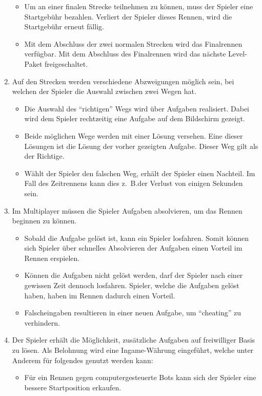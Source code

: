 \begin{enumerate}
\begin{itemize}
			\item{Um an einer finalen Strecke teilnehmen zu können, muss der Spieler eine Startgebühr bezahlen. Verliert der Spieler dieses Rennen, wird die Startgebühr erneut fällig.}
			\item{Mit dem Abschluss der zwei normalen Strecken wird das Finalrennen verfügbar. Mit dem Abschluss des Finalrennen wird das nächste Level-Paket freigeschaltet.}
		\end{itemize}
		\item{Auf den Strecken werden verschiedene Abzweigungen möglich sein, bei welchen der Spieler die Auswahl zwischen zwei Wegen hat.}
		\begin{itemize}
			\item{Die Auswahl des \enquote{richtigen} Wegs wird über Aufgaben realisiert. Dabei wird dem Spieler rechtzeitig eine Aufgabe auf dem Bildschirm gezeigt.}
			\item{Beide möglichen Wege werden mit einer Lösung versehen. Eine dieser Lösungen ist die Lösung der vorher gezeigten Aufgabe. Dieser Weg gilt als der Richtige.}
			\item{Wählt der Spieler den falschen Weg, erhält der Spieler einen Nachteil. Im Fall des Zeitrennens kann dies z.~B.\@ der Verlust von einigen Sekunden sein.}
		\end{itemize}
		\item{Im Multiplayer müssen die Spieler Aufgaben absolvieren, um das Rennen beginnen zu können.}
			\begin{itemize}
				\item{Sobald die Aufgabe gelöst ist, kann ein Spieler losfahren. Somit können sich Spieler über schnelles Absolvieren der Aufgaben einen Vorteil im Rennen erspielen.}
				\item{Können die Aufgaben nicht gelöst werden, darf der Spieler nach einer gewissen Zeit dennoch losfahren. Spieler, welche die Aufgaben gelöst haben, haben im Rennen dadurch einen Vorteil.}
				\item{Falscheingaben resultieren in einer neuen Aufgabe, um \enquote{cheating} zu verhindern.}
			\end{itemize}
		\item{Der Spieler erhält die Möglichkeit, zusätzliche Aufgaben auf freiwilliger Basis zu lösen. Als Belohnung wird eine Ingame-Währung eingeführt, welche unter Anderem für folgendes genutzt werden kann:}
		\begin{itemize}
			\item{Für ein Rennen gegen computergesteuerte Bots kann sich der Spieler eine bessere Startposition erkaufen.}

\end{itemize}
\end{enumerate}
